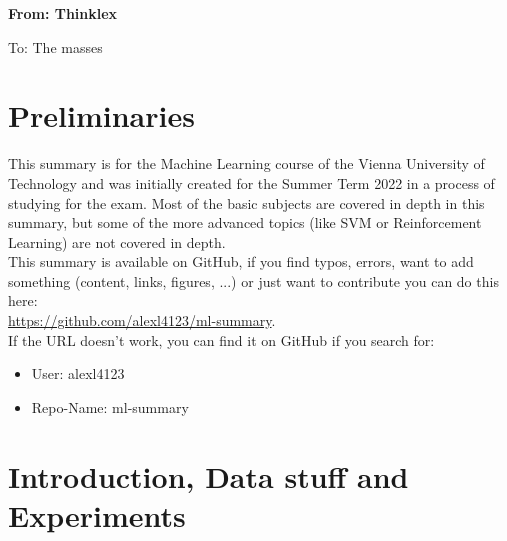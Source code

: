 \documentclass[12pt,a4paper]{article}
\newcommand{\name}{From: Thinklex}
\newcommand{\matriculation}{To: The masses}
\begin{document}
\thispagestyle{empty}
\noindent{}
\vspace{0.5cm}


\begin{center}
\textbf{\name} %

\matriculation %
\end{center}

\section{Preliminaries}

\noindent This summary is for the Machine Learning course of the Vienna University of Technology and was initially created for the Summer Term 2022 in a process of studying for the exam. Most of the basic subjects are covered in depth in this summary, but some of the more advanced topics (like SVM or Reinforcement Learning) are not covered in depth.\\
This summary is available on GitHub, if you find typos, errors, want to add something (content, links, figures, ...) or just want to contribute you can do this here:\\
\url{https://github.com/alexl4123/ml-summary}.\\[1em]
If the URL doesn't work, you can find it on GitHub if you search for:
\begin{itemize}
    \item User: alexl4123
    \item Repo-Name: ml-summary
\end{itemize}

\newpage
\section{Introduction, Data stuff and Experiments}
\end{document}
